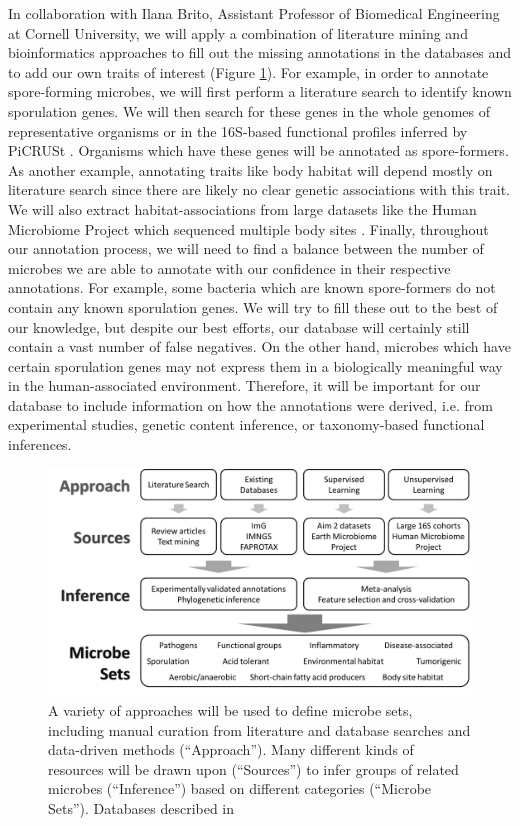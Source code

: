 \documentclass[12pt]{article}
\begin{document}
In collaboration with Ilana Brito, Assistant Professor of Biomedical Engineering at Cornell University, 
we will apply a combination of literature mining and bioinformatics approaches to fill 
out the missing annotations in the databases and to add our own traits
of interest (Figure \ref{fig:microbe_sets}). 
For example, in order to annotate spore-forming microbes, we will first perform a literature
search to identify known sporulation genes. We will then search for these genes in 
the whole genomes of representative organisms or in the 16S-based functional
profiles inferred by PiCRUSt \cite{langille-picrust-2013}.
Organisms which have these genes will be annotated as spore-formers. 
As another example, annotating traits like body habitat will 
depend mostly on literature search since there are likely no clear genetic
associations with this trait. We will also extract habitat-associations
from large datasets like the Human Microbiome Project which sequenced multiple body sites \cite{hmp-2012}.
Finally, throughout our annotation process, we will need to find a balance between
the number of microbes we are able to annotate with our confidence in their respective annotations.
For example, some bacteria which are known spore-formers do not contain any
known sporulation genes. We will try to fill these out to the best of our
knowledge, but despite our best efforts, our database will certainly 
still contain a vast number of false negatives.
On the other hand, microbes which have certain sporulation genes
may not express them in a biologically meaningful way in the human-associated
environment. Therefore, it will be important for our database to include information
on how the annotations were derived, i.e. from experimental studies, genetic content 
inference, or taxonomy-based functional inferences.

\begin{figure}
\begin{center}
	\includegraphics[scale=0.4]{microbe_sets}
	\caption{A variety of approaches will be used to define
	microbe sets, including manual curation from literature
	and database searches and data-driven methods (``Approach'').
	Many different kinds of resources will be drawn upon 
	(``Sources'') to infer groups of related microbes 
	(``Inference'') based on different categories 
	(``Microbe Sets''). Databases described in \cite{markowitz-img-2013, louca-faprotax-2016, lagkouvardos-imngs-2016}}
	\label{fig:microbe_sets}
\end{center}
\end{figure}
\end{document}
